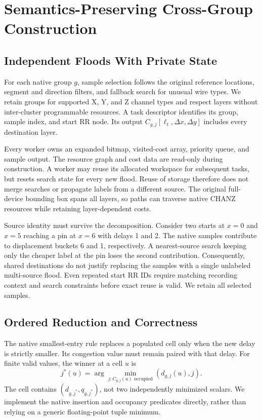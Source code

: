 \documentclass[conference,10pt,letterpaper]{IEEEtran}
\begin{document}
\section{Semantics-Preserving Cross-Group Construction}
\subsection{Independent Floods With Private State}
For each native group $g$, sample selection follows the original reference locations, segment and direction filters, and fallback search for unusual wire types. We retain groups for supported X, Y, and Z channel types and respect layers without inter-cluster programmable resources. A task descriptor identifies its group, sample index, and start RR node. Its output $C_{g,j}[\ell_t,\Delta x,\Delta y]$ includes every destination layer.

Every worker owns an expanded bitmap, visited-cost array, priority queue, and sample output. The resource graph and cost data are read-only during construction. A worker may reuse its allocated workspace for subsequent tasks, but resets search state for every new flood. Reuse of storage therefore does not merge searches or propagate labels from a different source. The original full-device bounding box spans all layers, so paths can traverse native CHANZ resources while retaining layer-dependent costs.

Source identity must survive the decomposition. Consider two starts at $x=0$ and $x=5$ reaching a pin at $x=6$ with delays 1 and 2. The native samples contribute to displacement buckets 6 and 1, respectively. A nearest-source search keeping only the cheaper label at the pin loses the second contribution. Consequently, shared destinations do not justify replacing the samples with a single unlabeled multi-source flood. Even repeated start RR IDs require matching recording context and search constraints before exact reuse is valid. We retain all selected samples.

\subsection{Ordered Reduction and Correctness}
The native smallest-entry rule replaces a populated cell only when the new delay is strictly smaller. Its congestion value must remain paired with that delay. For finite valid values, the winner at a cell $u$ is
\begin{equation}
 j^*(u)=\arg\min_{j:C_{g,j}(u)\text{ occupied}}(d_{g,j}(u),j).
 \label{eq:ordered}
\end{equation}
The cell contains $(d_{g,j^*},q_{g,j^*})$, not two independently minimized scalars. We implement the native insertion and occupancy predicates directly, rather than relying on a generic floating-point tuple minimum.
\end{document}
